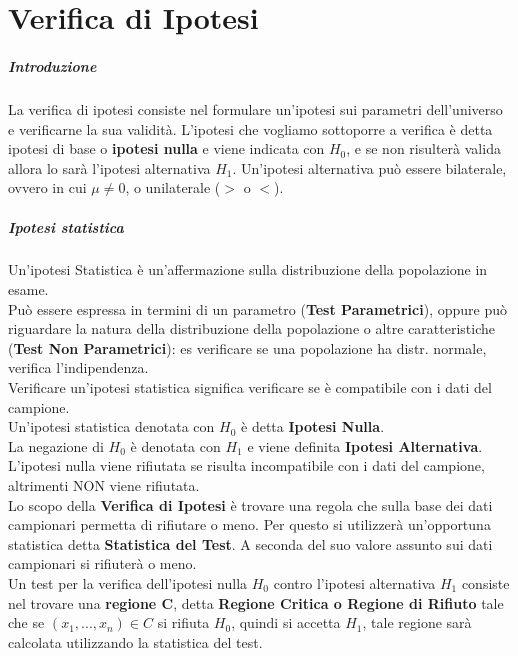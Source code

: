 \chapter{Verifica di Ipotesi}
\paragraph{Introduzione}
La verifica di ipotesi consiste nel formulare un'ipotesi sui parametri dell'universo e verificarne la sua validità.
L'ipotesi che vogliamo sottoporre a verifica è detta ipotesi di base o \textbf{ipotesi nulla} e viene indicata con $H_0$, e se non risulterà valida allora
lo sarà l'ipotesi alternativa $H_1$.
Un'ipotesi alternativa può essere bilaterale, ovvero in cui $\mu \neq 0$, o unilaterale ($>$ o $<$).


\paragraph*{Ipotesi statistica} Un'ipotesi Statistica è un'affermazione sulla
distribuzione della popolazione in esame.
\\ Può essere espressa in termini di un parametro (\textbf{Test Parametrici}), oppure
può riguardare la natura della distribuzione della popolazione o altre
caratteristiche (\textbf{Test Non Parametrici}): es verificare se una popolazione
ha distr. normale, verifica l'indipendenza.
\\ Verificare un'ipotesi statistica significa verificare se è compatibile con i dati
del campione.
\\ Un'ipotesi statistica denotata con $H_0$ è detta \textbf{Ipotesi Nulla}.
\\ La negazione di $H_0$ è denotata con $H_1$ e viene definita \textbf{Ipotesi Alternativa}.
L'ipotesi nulla viene rifiutata se risulta incompatibile con i dati del campione,
altrimenti NON viene rifiutata.
\\ Lo scopo della \textbf{Verifica di Ipotesi} è trovare una regola che sulla base dei
dati campionari permetta di rifiutare o meno. Per questo si utilizzerà un'opportuna
statistica detta \textbf{Statistica del Test}. A seconda del suo valore assunto sui dati
campionari si rifiuterà o meno.
\\ Un test per la verifica dell'ipotesi nulla $H_0$ contro l'ipotesi alternativa
$H_1$ consiste nel trovare una \textbf{regione C}, detta \textbf{Regione Critica o Regione di Rifiuto}
tale che se $(x_1, ..., x_n) \in C$ si rifiuta $H_0$, quindi si accetta $H_1$,
tale regione sarà calcolata utilizzando la statistica del test.
